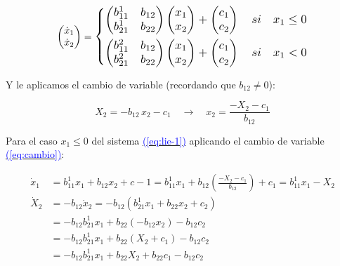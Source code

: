\documentclass[12pt,a4paper]{report} %
\newcommand{\eref}[1]{\hyperref[#1]{\textcolor{blue}{(\ref*{#1})}}}
\newcommand{\eref}[1]{\hyperref[#1]{\textcolor{blue}{\textit{(\ref*{#1})}}}}
\begin{document}
	\begin{equation}
		\begin{pmatrix*}[r]
			\dot{x}_1 \\ \dot{x}_2
		\end{pmatrix*}=
		\label{eq:lie-1}
		\scalebox{1.2}{$\displaystyle
			\left\{
			\begin{aligned}
				\begin{pmatrix*}[r]
					b_{11}^1 & b_{12} \\
					b_{21}^1 & b_{22}
				\end{pmatrix*}\begin{pmatrix*}[r]
				x_1\\x_2
				\end{pmatrix*}+\begin{pmatrix*}[r]
				c_1 \\ c_2
				\end{pmatrix*} \quad si \quad x_1 \leq 0 \\
				\begin{pmatrix*}[r]
					b_{11}^2 & b_{12} \\
					b_{21}^2 & b_{22}
				\end{pmatrix*}\begin{pmatrix*}[r]
				x_1\\x_2
				\end{pmatrix*}+\begin{pmatrix*}[r]
					c_1 \\ c_2
				\end{pmatrix*} \quad si \quad x_1 < 0
			\end{aligned}
			\right.
			$}
	\end{equation}\smallskip
	
	\vspace{0.5cm}\noindent Y le aplicamos el cambio de variable (recordando que $b_{12}\neq0$): 
	
	\begin{equation}
		\label{eq:cambio}
		X_2=-b_{12}\,x_2-c_1\quad \rightarrow \quad x_2=\frac{-X_2-c_1}{b_{12}}
	\end{equation}\smallskip

\newpage

	\noindent Para el caso $x_1\leq 0$ del sistema \eref{eq:lie-1} aplicando el cambio de variable \eref{eq:cambio}:
	
	\begin{equation}
		\label{eq:q1}
	\begin{aligned}
		\dot{x}_1&=b_{11}^1x_1+b_{12}x_2+c-1=b_{11}^1x_1+b_{12}\left(\frac{-X_2-c_1}{b_{12}}\right)+c_1=b_{11}^1x_1-X_2 \\[2mm]
		\dot{X}_2&=-b_{12}\dot{x}_2=-b_{12}\left(b_{21}^1x_1+b_{22}x_2+c_2\right) \\[2mm]
		&=-b_{12}b_{21}^1x_1+b_{22}\left(-b_{12}x_2\right)-b_{12}c_2  \\[2mm]
		&=-b_{12}b_{21}^1x_1+b_{22}\left(X_2+c_1\right)-b_{12}c_2 \\[2mm]
		&=-b_{12}b_{21}^1x_1+b_{22}X_2+b_{22}c_1-b_{12}c_2
	\end{aligned}
	\end{equation}\smallskip
	
\end{document}
